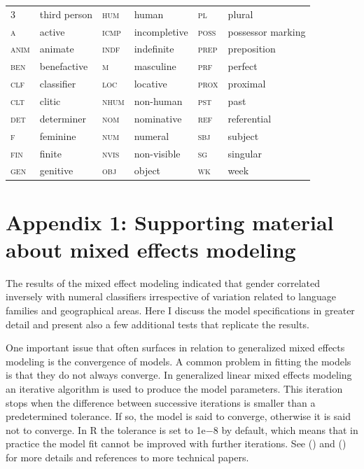 \documentclass[output=collectionpaper]{langsci/langscibook}
\begin{document}
\begin{tabular}{@{}llllll@{}}
\textsc{3}	&	third person	&	\textsc{hum}	&	human	&	\textsc{pl}	&	plural	\\
\textsc{a}	&	active	&	\textsc{icmp}	&	incompletive	&	\textsc{poss}	&	possessor marking	\\
\textsc{anim}	&	animate	&	\textsc{indf}	&	indefinite	&	\textsc{prep}	&	preposition	\\
\textsc{ben}	&	benefactive	&	\textsc{m}	&	masculine	&	\textsc{prf}	&	perfect	\\
\textsc{clf}	&	classifier	&	\textsc{loc}	&	locative	&	\textsc{prox}	&	proximal	\\
\textsc{clt}	&	clitic	&	\textsc{nhum}	&	non-human	&	\textsc{pst}	&	past	\\
\textsc{det}	&	determiner	&	\textsc{nom}	&	nominative	&	\textsc{ref}	&	referential	\\
\textsc{f}	&	feminine	&	\textsc{num}	&	numeral	&	\textsc{sbj}	&	subject	\\
\textsc{fin}	&	finite	&	\textsc{nvis}	&	non-visible	&	\textsc{sg}	&	singular	\\
\textsc{gen}	&	genitive	&	\textsc{obj}	&	object	&	\textsc{wk}	&	week	\\
\end{tabular}


\section*{Appendix 1: Supporting material about mixed effects modeling}

The results of the mixed effect modeling indicated that gender correlated inversely with numeral classifiers irrespective of variation related to language families and geographical areas. Here I discuss the model specifications in greater detail and present also a few additional tests that replicate the results.

One important issue that often surfaces in relation to generalized mixed effects modeling is the convergence of models. A common problem in fitting the models is that they do not always converge. In generalized linear mixed effects modeling an iterative algorithm is used to produce the model parameters. This iteration stops when the difference between successive iterations is smaller than a predetermined tolerance. If so, the model is said to converge, otherwise it is said not to converge. In R the tolerance is set to 1e${-8}$ by default, which means that in practice the model fit cannot be improved with further iterations. See (\citealt[2, 9, 10, 31]{Hardin2007}) and (\citealt[3--4]{Kimballsubmitted}) for more details and references to more technical papers.
\end{document}
